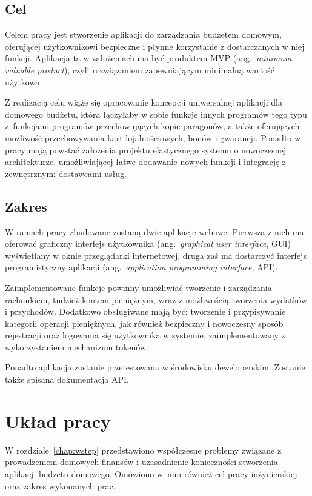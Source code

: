 \subsection{Cel}
\label{subsec:cel}
Celem pracy jest stworzenie aplikacji do zarządzania budżetem domowym, oferującej użytkownikowi bezpieczne i płynne korzystanie z dostarczanych w niej funkcji.
Aplikacja ta w założeniach ma być produktem MVP (ang.~\emph{minimum valuable product}), czyli rozwiązaniem zapewniającym minimalną wartość użytkową.  

Z realizacją celu wiąże się opracowanie koncepcji uniwersalnej aplikacji dla domowego budżetu, która łączyłaby w sobie funkcje innych programów tego typu z~funkcjami programów przechowujących kopie paragonów, a także oferujących możliwość przechowywania kart lojalnościowych, bonów i gwarancji. 
Ponadto w pracy mają powstać założenia projektu elastycznego systemu o nowoczesnej architekturze, umożliwiającej łatwe dodawanie nowych funkcji i integrację z zewnętrznymi dostawcami usług. 

\subsection{Zakres}
\label{subsec:zakres}
W ramach pracy zbudowane zostaną dwie aplikacje webowe. Pierwsza z nich ma oferować graficzny interfejs użytkownika (ang.~\emph{graphical user interface}, GUI) wyświetlany w oknie przeglądarki internetowej, druga zaś ma dostarczyć interfejs programistyczny aplikacji (ang.~\emph{application programming interface}, API).

Zaimplementowane funkcje powinny umożliwiać tworzenie i zarządzania rachunkiem, tudzież kontem pieniężnym, wraz z możliwością tworzenia wydatków i przychodów. Dodatkowo obsługiwane mają być: tworzenie i przypisywanie kategorii operacji pieniężnych, jak również bezpieczny i nowoczesny sposób rejestracji oraz logowania się użytkownika w systemie, zaimplementowany z wykorzystaniem mechanizmu tokenów.

Ponadto aplikacja zostanie przetestowana w środowisku deweloperskim. Zostanie także spisana dokumentacja API.

\section{Układ pracy}
\label{sec:uklad-pracy}
W rozdziale~\ref{chap:wstep} przedstawiono współczesne problemy związane z prowadzeniem domowych finansów i uzasadnienie konieczności stworzenia aplikacji budżetu domowego. Omówiono w~nim również cel pracy inżynierskiej oraz zakres wykonanych prac.

